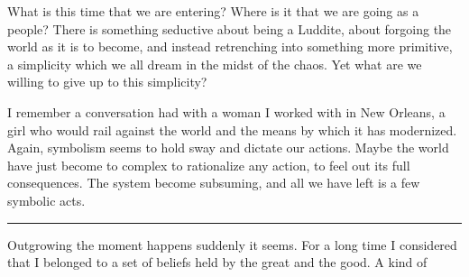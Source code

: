 \documentclass[ebook, 10pt, openright, onecolumn]{memoir}
\newcommand*\starbreak{\fancybreak*{\Large{* * *}}}
\begin{document}
What is this time that we are entering? Where is it that we are going as a
people?  There is something seductive about being a Luddite, about forgoing the
world as it is to become, and instead retrenching into something more primitive,
a simplicity which we all dream in the midst of the chaos.  Yet what are we
willing to give up to this simplicity?

I remember a conversation had with a woman I worked with in New Orleans, a girl
who would rail against the world and the means by which it has modernized.
Again, symbolism seems to hold sway and dictate our actions.  Maybe the world
have just become to complex to rationalize any action, to feel out its full
consequences.  The system become subsuming, and all we have left is a few
symbolic acts.


\starbreak

Outgrowing the moment happens suddenly it seems.  For a long time I considered
that I belonged to a set of beliefs held by the great and the good.  A kind of 
\end{document}
